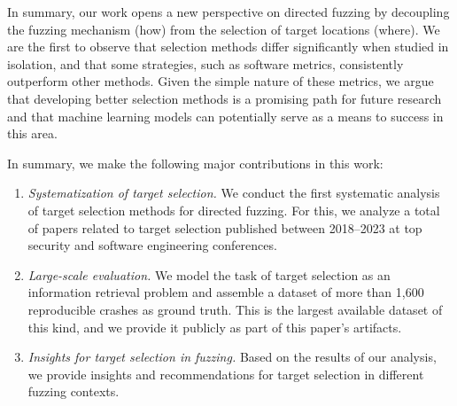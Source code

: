 In summary, our work opens a new perspective on directed fuzzing by decoupling the fuzzing mechanism (how) from the selection of target locations (where). We are the first to observe that selection methods differ significantly when studied in isolation, and that some strategies, such as software metrics, consistently outperform other methods. Given the simple nature of these metrics, we argue that developing better selection methods is a promising path for future research and that machine learning models can potentially serve as a means to success in this area.

 In summary, we make the following
major contributions in this work:

\begin{enumerate}
\setlength{\itemsep}{4pt}

\item \emph{Systematization of target selection.} We conduct the first systematic analysis of target selection methods for directed fuzzing. For this, we analyze a total of \numanalyzedpapers papers related to target selection published between 2018--2023 at top security and software engineering conferences.

\item \emph{Large-scale evaluation.} We model the task of target selection as an information retrieval problem and assemble a dataset of more than 1,600 reproducible crashes as ground truth. This is the largest available dataset of this kind, and we provide it publicly as part of this paper's artifacts.

\item \emph{Insights for target selection in fuzzing.}  Based on the results of our analysis, we provide insights and recommendations for target selection in different fuzzing contexts.
\end{enumerate}
